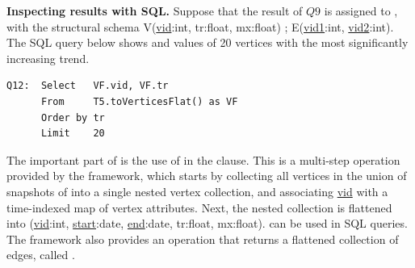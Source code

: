 {\bf Inspecting results with SQL.}  Suppose that the result of $Q9$ is
assigned to , with the structural schema
V(\underline{vid}:int, tr:float, mx:float) ; E(\underline{vid1}:int,
\underline{vid2}:int).  The SQL query below shows 
and  values of 20 vertices with the most significantly
increasing  trend.

\begin{small}
\begin{verbatim}
Q12:  Select   VF.vid, VF.tr  
      From     T5.toVerticesFlat() as VF
      Order by tr
      Limit    20
\end{verbatim}
\end{small}

The important part of  is the use of
 in the  clause.  This is a
multi-step operation provided by the \ql framework, which starts by
collecting all vertices in the union of snapshots of  into a
single nested vertex collection, and associating \underline{vid} with
a time-indexed map of vertex attributes.  Next, the nested collection
is flattened into  (\underline{vid}:int,
\underline{start}:date, \underline{end}:date, tr:float, mx:float).
 can be used in SQL queries.  The \ql framework also
provides an operation that returns a flattened collection of edges,
called .



